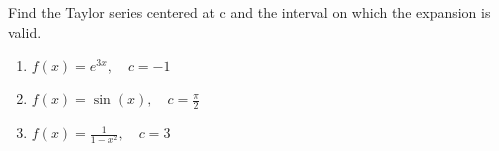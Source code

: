 \newpage %

Find the Taylor series centered at c and the interval on which the expansion is
valid.
\begin{enumerate}[itemsep=18em, resume]
  \item \(\displaystyle  f(x) = e^{3x}, \quad c = -1 \)
  \item \(\displaystyle  f(x) = \sin(x), \quad c = \frac{\pi}{2} \)
  \item \(\displaystyle  f(x) = \frac{1}{1-x^2}, \quad c = 3\)
\end{enumerate}


